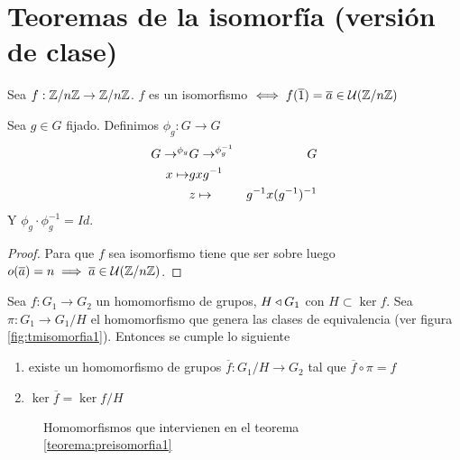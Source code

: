 \section{Teoremas de la isomorfía (versión de clase)}

\begin{pro}[O ejemplo]
	Sea $f: \mathbb{Z}/n\mathbb{Z} \to \mathbb{Z}/n\mathbb{Z}$. $f$ es un isomorfismo $\iff f(\overline{1}) = \overline{a} \in \mathcal{U}(\mathbb{Z}/n\mathbb{Z})$
\end{pro}

\begin{ej}
	Sea $g \in G$ fijado. Definimos $\phi_g : G \to G$
	\begin{align*}
		G \to^{\phi_g} & G \to^{\phi^{-1}_g} & G \\
		x \mapsto &gxg^{-1} & \\
		&z \mapsto &g^{-1}x(g^{-1})^{-1}
	\end{align*}
	Y $\phi_g \cdot \phi_g^{-1} = Id$.
\end{ej}

\begin{proof}
	Para que $f$ sea isomorfismo tiene que ser sobre luego $o(\overline{a}) = n \implies \overline{a} \in \mathcal{U}(\mathbb{Z}/n\mathbb{Z})$.
\end{proof}

\begin{thm}
	\label{teorema:preisomorfia1}
	Sea $f: G_1 \to G_2$ un homomorfismo de grupos, $H \mathbin{\triangleleft} G_1$ con $H \subset \ker f$. Sea $\pi: G_1 \to G_1/H$ el homomorfismo que genera las clases de equivalencia (ver figura \ref{fig:tmisomorfia1}). Entonces se cumple lo siguiente
	\begin{enumerate}
		\item existe un homomorfismo de grupos $\overline{f}:G_1/H \to G_2$ tal que $\overline{f} \circ \pi = f$
		\item $\ker \overline{f} = \ker f / H$
	\end{enumerate}
\end{thm}

\begin{figure}[h]
\centering
{}
\caption{Homomorfismos que intervienen en el teorema \ref{teorema:preisomorfia1}}
\label{fig:otracosa}
\end{figure}

